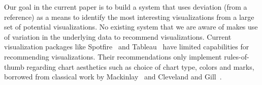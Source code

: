 Our goal in the current paper is to build a system that uses deviation (from a reference) as a means to identify
the most interesting visualizations from a large set of potential visualizations.
No existing system that we are aware of makes use of variation in the underlying
data to recommend visualizations.  
Current visualization packages like Spotfire~\cite{Ahlberg:1996:SIE:245882.245893} and Tableau~\cite{tableau,polaris} have limited capabilities for 
recommending visualizations.
Their recommendations only implement rules-of-thumb 
regarding chart aesthetics such as choice of
chart type, colors and marks, borrowed from
classical work by Mackinlay~\cite{Mackinlay:1986:ADG:22949.22950} and Cleveland and Gill~\cite{cleveland1984graphical}.



